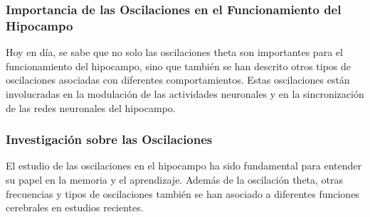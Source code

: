 \documentclass[12pt, letterpaper]{article}
\begin{document}
\subsubsection{Importancia de las Oscilaciones en el Funcionamiento del Hipocampo}
Hoy en día, se sabe que no solo las oscilaciones theta son importantes para el funcionamiento del hipocampo, sino que también se han descrito otros tipos de oscilaciones asociadas con diferentes comportamientos. Estas oscilaciones están involucradas en la modulación de las actividades neuronales y en la sincronización de las redes neuronales del hipocampo.

\subsubsection{Investigación sobre las Oscilaciones}
El estudio de las oscilaciones en el hipocampo ha sido fundamental para entender su papel en la memoria y el aprendizaje. Además de la oscilación theta, otras frecuencias y tipos de oscilaciones también se han asociado a diferentes funciones cerebrales en estudios recientes.
\end{document}
